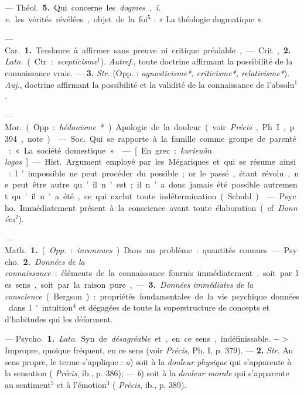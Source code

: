 \begin{itemize}[leftmargin=1cm, label=, itemsep=1pt]
— \si{Théol.} {\bf 5.} Qui concerne les
{\it dogmes}, {\it i. e.} les vérités révélées,
objet de la foi$^5$ : « La théologie dogmatique ».

 — \si{Car.} {\bf 1.} Tendance à
affirmer sans preuve ni critique
préalable,

— Crit, {\bf 2.} {\it Lato.} (Ctr. : {\it scepticisme}$^1$). {\it Autref.}, toute doctrine affirmant la possibilité de la connaissance vraie. — {\bf 3.} {\it Str.} (Opp. : {\it agnosticisme*, criticisme*, relativisme*}).
{\it Auj.}, doctrine affirmant la possibilité et la validité
de la connaissance de l’absolu$^1$.

 — \si{Mor.} (Opp. : {\it hédonisme}*).
Apologie de la douleur (voir  {\it Précis},
Ph. I, p. 394, note).

 — \si{Soc.} Qui se rapporte à
la famille comme groupe de parenté :
« La société domestique ».

 — [En grec : {\it kurieuôn logos}] — \si{Hist.}
Argument employé par les Mégariques et qui se résume ainsi : l’impossible ne
peut procéder du possible ; or le passé, étant révolu, ne peut être autre
qu’il n’est ; il n’a donc jamais été possible autrement qu'il n'a été, ce qui
exclut toute indétermination (Schuhl).

 — \si{Psycho.} Immédiatement
présent à la conscience avant toute
élaboration (cf. {\it Données}$^2$).

 — \si{Math.} {\bf 1.} ({\it Opp.} : {\it inconnues}).
Dans un problème : quantités connues.

— \si{Psycho.} {\bf 2.} {\it Données de la connaissance} :
éléments de la connaissance fournis immédiatement, soit
par les sens, soit par la raison pure,
— {\bf 3.} {\it Données immédiates de la conscience} (Bergson) :
propriétés fondamentales de la vie psychique données dans l'intuition$^4$
et dégagées de toute la superstructure de concepts
et d’habitudes qui les déforment.

 — \si{Psycho.} {\bf 1.} {\it Lato.} Syn. de
{\it désagréable} et, en ce sens, indéfinissable. $->$ Impropre, quoique fréquent, en ce sens (voir  {\it Précis}, Ph. I,
p. 379). — {\bf 2.} {\it Str.} Au sens propre,
le terme s’applique : {\it a}) soit à la {\it douleur physique} qui s'apparente à la
sensation ( {\it Précis}, ib., p. 386); —
{\it b}) soit à la {\it douleur morale} qui s’apparente au sentiment$^5$ et à l’émotion$^3$
( {\it Précis}, ib., p. 389).


\end{itemize}
